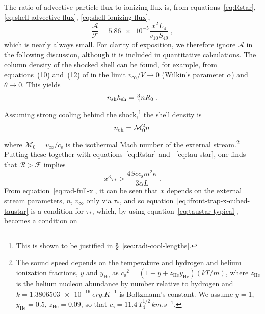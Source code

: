 \message{ !name(dusty-bow-wave.tex)}\documentclass[useAMS, usenatbib, a4paper]{mnras}
\newcommand\sound{\ensuremath{c_{\text{s}}}}
\begin{document}
The ratio of advective particle flux to ionizing flux is, from
equations~\eqref{eq:Rstar}, \eqref{eq:shell-advective-flux},
\eqref{eq:shell-ionizing-flux},
\begin{equation}
  \label{eq:advective-over-ionizing-flux}
  \frac{\mathcal{A}}{\mathcal{F}} = \num{5.86e-5} \frac{x^2 L_4}{v_{10} S_{49}} \ , 
\end{equation}
which is nearly always small.  For clarity of exposition, we therefore
ignore \(\mathcal{A}\) in the following discussion, although it is
included in quantitative calculations.  The column density of the
shocked shell can be found, for example, from equations~(10) and~(12)
of \citet{Wilkin:1996a} in the limit \(v_\infty/V \to 0\) (Wilkin's parameter
\(\alpha\)) and \(\theta \to 0\).  This yields
\begin{equation}
  \label{eq:shocked-shell-column}
  n_{\text{sh}} h_{\text{sh}} = \tfrac34 n R_0 \ .
\end{equation}
Assuming strong cooling behind the shock,\footnote{%
  This is shown to be justified in \S~\ref{sec:radi-cool-lengths}.
} %
the shell density is
\begin{equation}
  \label{eq:isothermal-shell-density}
  n_{\text{sh}} = \mathcal{M}_0^2 n \,
\end{equation}
where
\(\mathcal{M}_0 = v_\infty / \sound\) is the isothermal Mach number of the
external stream.\footnote{%
  \label{fn:temperature-dependence}
  The sound speed depends on the temperature and hydrogen and helium
  ionization fractions, \(y\) and \(y_{\text{He}}\) as
  \(\sound^2 = (1 + y + z_{\text{He}} y_{\text{He}}) (k T /
  \bar{m})\), where \(z_{\text{He}}\) is the helium nucleon abundance
  by number relative to hydrogen and
  \(k = \SI{1.3806503e-16}{erg.K^{-1}}\) is Boltzmann's constant.  We
  assume \(y = 1\), \(y_{\text{He}} = 0.5\), \(z_{\text{He}} = 0.09\),
  so that \(\sound = \num{11.4}\, T_4^{1/2}\, \si{km.s^{-1}}\). } %
Putting these together with equations~\eqref{eq:Rstar} and
~\eqref{eq:tau-star}, one finds that \(\mathcal{R} > \mathcal{F}\)
implies
\begin{equation}
  \label{eq:ifront-trap-x-cubed-taustar}
  x^3 \tau_* > \frac{4 S c \sound \bar{m}^2 \kappa}{3 \alpha L} \ .
\end{equation}
From equation~\eqref{eq:rad-full-x}, it can be seen that \(x\) depends
on the external stream parameters, \(n\), \(v_\infty\) only via
\(\tau_*\), and so equation~\eqref{eq:ifront-trap-x-cubed-taustar} is a
condition for \(\tau_*\), which, by using
equation~\eqref{eq:taustar-typical}, becomes a condition on
\end{document}
